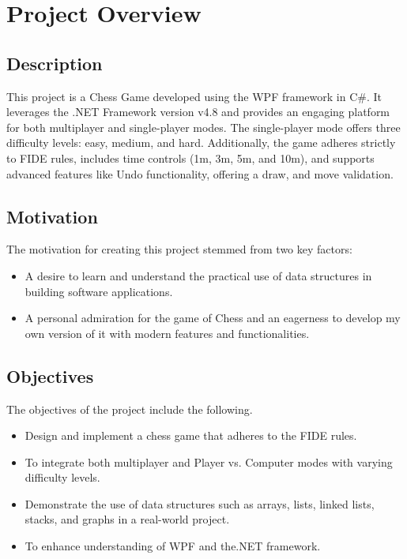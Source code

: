 \documentclass[a4paper,12pt]{article}
\begin{document}
\thispagestyle{empty}

\listoftables

\newpage

\pagestyle{fancy}
\fancyhf{}
\fancyfoot[R]{{\thepage}}

\section{Project Overview}

\subsection{Description}
This project is a Chess Game developed using the WPF framework in C\#. It leverages the .NET Framework version v4.8 and provides an engaging platform for both multiplayer and single-player modes. The single-player mode offers three difficulty levels: easy, medium, and hard. Additionally, the game adheres strictly to FIDE rules, includes time controls (1m, 3m, 5m, and 10m), and supports advanced features like Undo functionality, offering a draw, and move validation. 

\subsection{Motivation}
The motivation for creating this project stemmed from two key factors:
\begin{itemize}
    \item A desire to learn and understand the practical use of data structures in building software applications.
    \item A personal admiration for the game of Chess and an eagerness to develop my own version of it with modern features and functionalities.
\end{itemize}

\subsection{Objectives}
The objectives of the project include the following.
\begin{itemize}
    \item Design and implement a chess game that adheres to the FIDE rules.
    \item To integrate both multiplayer and Player vs. Computer modes with varying difficulty levels.
    \item Demonstrate the use of data structures such as arrays, lists, linked lists, stacks, and graphs in a real-world project.
    \item To enhance understanding of WPF and the.NET framework.
\end{itemize}
\end{document}
